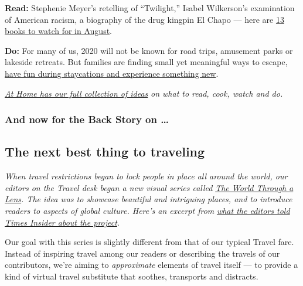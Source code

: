 \textbf{Read:} Stephenie Meyer's retelling of ``Twilight,'' Isabel
Wilkerson's examination of American racism, a biography of the drug
kingpin El Chapo --- here are
\href{https://www.nytimes3xbfgragh.onion/2020/07/30/books/new-august-books.html?action=click\&module=RelatedLinks\&pgtype=collection}{13
books to watch for in August}.

\textbf{Do:} For many of us, 2020 will not be known for road trips,
amusement parks or lakeside retreats. But families are finding small yet
meaningful ways to escape,
\href{https://www.nytimes3xbfgragh.onion/2020/07/24/parenting/summer-staycation-coronavirus.html?action=click\&module=RelatedLinks\&pgtype=collection}{have
fun during staycations and experience something new}.

\href{https://www.nytimes3xbfgragh.onion/spotlight/at-home}{\emph{At
Home has our full collection of ideas}} \emph{on what to read, cook,
watch and do.}

\hypertarget{and-now-for-the-back-story-on-}{%
\subsubsection{And now for the Back Story on
\ldots{}}\label{and-now-for-the-back-story-on-}}

\hypertarget{the-next-best-thing-to-traveling}{%
\subsection{The next best thing to
traveling}\label{the-next-best-thing-to-traveling}}

\emph{When travel restrictions began to lock people in place all around
the world, our editors on the Travel desk began a new visual series
called}
\href{https://www.nytimes3xbfgragh.onion/column/the-world-through-a-lens}{\emph{The
World Through a Lens}}\emph{. The idea was to showcase beautiful and
intriguing places, and to introduce readers to aspects of global
culture. Here's an excerpt from}
\href{https://www.nytimes3xbfgragh.onion/2020/08/03/insider/letting-their-cameras-transport-you.html}{\emph{what
the editors told Times Insider about the project}}\emph{.}

Our goal with this series is slightly different from that of our typical
Travel fare. Instead of inspiring travel among our readers or describing
the travels of our contributors, we're aiming to \emph{approximate}
elements of travel itself --- to provide a kind of virtual travel
substitute that soothes, transports and distracts.

